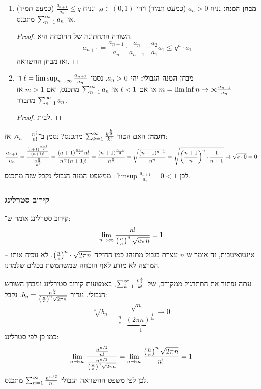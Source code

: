 \documentclass[name=רשימות חשבון דיפרנציאלי ואינטגרלי 1א]{../../../tex/classes/megasumPreamble}
\begin{document}
\begin{enumerate}
\begin{proof}
		\end{proof}
		\item \textbf{מבחן המנה: }נניח $a_n > 0$ (כמעט תמיד) ויהי $q \in (0, 1)$, ונניח $\frac{a_{n + 1}}{a_n} \le q$ (כמעט תמיד) אז $\sum_{n = 1}^{\infty} a_n$ מתכנס.
		\begin{proof}
			השורה התחתונה של ההוכחה היא:
			\[ a_{n + 1} = \frac{a_{n + 1}}{a_n} \cdot \frac{a_n}{a_{n - 1}} \cdots \frac{a_2}{a_1}a_1 \le q^{n} \cdot a_1 \]
			ואז מבחן ההשוואה.
		\end{proof}
		\item \textbf{מבחן המנה הגבולי: }יהי $a_n > 0$. נסמן $\ell = \limsup_{n \to \infty} \frac{a_{n + 1}}{a_n}$ ו־$m = \liminf{n \to \infty} \frac{a_{n + 1}}{a_n}$ אז אם $\ell < 1$ אז $\sum_{n = 1}^{\infty} a_n$ מתכנס, ואם $m > 1$ אז $\sum_{n = 1}^{\infty} a_n$ מתבדר. \begin{proof}
			לבית.
		\end{proof}
	\end{enumerate}

	\textbf{דוגמה: }האם הטור $\sum_{k = 1}^{\infty} \frac{k^{\frac{k}{2}}}{k!}$ מתכנס? נסמן ב־$a_n = \frac{n^{\frac{n}{2}}}{n!}$. אז:
	\[ \frac{a_{n + 1}}{a_n} = \frac{\frac{(n + 1)^{\frac{n + 1}{2}}}{(n + 1)!}}{\frac{n^{\frac{n}{2}}}{n!}} = \frac{(n + 1)^{\frac{n + 1}{2}}n!}{n^{\frac{n}{2}}(n + 1)!} = \frac{(n + 1)^{\frac{n - 1}{2}}}{n^{\frac{n}{2}}} = \sqrt{\frac{(n + 1)^{n - 1}}{n^{n}}} = \sqrt{\left ( \frac{n + 1}{n} \right )^{n} \cdot \frac{1}{n + 1}} \to \sqrt{e \cdot 0} = 0 \]
	לכן $\limsup \frac{a_{n + 1}}{a_n} = 0 < 1$. ממשפט המנה הגבולי נקבל שזה מתכנס.

	\subsubsection{קירוב סטרלינג}
	קירוב סטרלינג אומר ש־:
	\[ \lim_{n \to \infty} \frac{n!}{\left ( \frac{n}{e} \right )^{n}\sqrt{e \pi n}} = 1 \]
	אינטואיטבית, זה אומר ש־$n$ עצרת בגבול מתנהג כמו החזקה $\left ( \frac{n}{e} \right )^{n} \cdot \sqrt{2\pi n}$. לא נוכיח אותו – המרצה לא מודע לאף הוכחה שמשתמשת בכלים שלמדנו.

	עתה נפתור את התתרגיל ממקודם, של $\sum_{k = 1}^{\infty} \frac{k^{\frac{k}{2}}}{k!}$, באמצעות קירוב סטירלינג ומבחן השורש הגבולי. נגדיר $b_n = \frac{n^{\frac{n}{2}}}{\left ( \frac{n}{e} \right )^{n}\sqrt{2\pi n}}$. נקבל:
	\[ \sqrt[n]{b_n} = \frac{\sqrt n}{\frac{n}{e} \cdot \underbrace{(2 \pi n)^{\frac{1}{2n}}}_{1}} \to 0 \]
	כמו כן לפי סטרלינג:
	\[ \lim_{n \to \infty} \frac{\frac{n^{n/2}}{n!}}{\frac{n^{n/2}}{\left ( \frac{n}{e} \right )^{n}\sqrt{2 \pi n}}} = \lim_{n \to \infty} \frac{\left ( \frac{n}{e} \right )^{n}\sqrt{2 \pi n}}{n!} = 1 \]
	לכן לפי משפט ההשוואה הגבולי $\sum_{n = 1}^{\infty} \frac{n^{n/2}}{n!}$ מתכנס.
\end{document}
